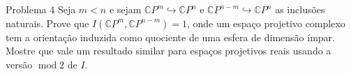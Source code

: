 \iffalse\begin{proof}[Solution]\leavevmode
	Considere a carta \(\varphi_0:\{z_0=1\}\subset\mathbb{C}P^{1}\to \mathbb{C}\), \([1:z]\mapsto z\). Obtemos
\begin{align*}
\frac{\partial }{\partial z}(f \circ \varphi_0^{-1})&=\frac{(1+|z|^2)^m \frac{\partial |1+z^m|^2}{\partial z}-m(1+|z|^2)^{m-1}\cdot \bar{z}\cdot |1+z^m|^2}{(1+|z|^2)^{2m}}.
\end{align*}
Calculamos com calma
\[\frac{\partial |1+z^m|^2}{\partial z}=\frac{\partial }{\partial z}(1+z^m)\overline{(1+z^m)}=(1+z^m)\cdot 0+mz^{m-1}\overline{(1+z^m)}\]
E sustituimos:
\begin{align*}
\frac{\partial }{\partial z}(f \circ \varphi_0^{-1})&=\frac{(1+|z|^2)^m \cdot mz^{m-1}\overline{(1+z^m)}-m(1+|z|^2)^{m-1}\cdot \bar{z}\cdot |1+z^m|^2}{(1+|z|^2)^{2m}}.
\end{align*}
\end{proof}\fi

\begin{thing1}{Problema 4}\label{prob:a 4}\leavevmode
Seja \(m<n\) e sejam \(\mathbb{C}P^{m}\hookrightarrow \mathbb{C}P^{n}\) e \(\mathbb{C}P^{n-m}\hookrightarrow \mathbb{C}P^{n}\) as inclusões naturais. Prove que \(I(\mathbb{C}P^{m},\mathbb{C}P^{n-m})=1\), onde um espaço projetivo complexo tem a orientação induzida como quociente de uma esfera de dimensão ímpar. Mostre que vale um resultado similar para espaços projetivos reais usando a versão \(\operatorname{mod}2\) de \(I\).
\end{thing1}

